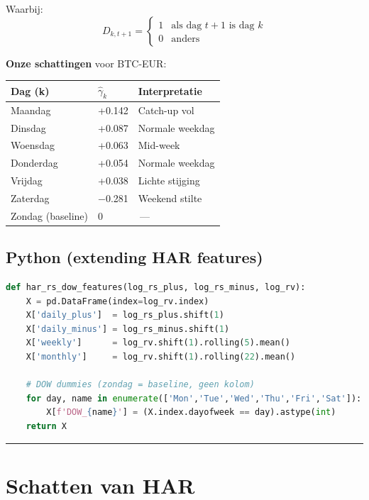 \documentclass[11pt,a4paper]{article}
\begin{document}
Waarbij:
\[D_{k,t+1} = \begin{cases} 1 & \text{als dag } t+1 \text{ is dag } k \\ 0 & \text{anders} \end{cases}\]

\textbf{Onze schattingen} voor BTC-EUR:

\begin{longtable}[]{@{}lll@{}}
\toprule
Dag (k) & \(\hat\gamma_k\) & Interpretatie \\
\midrule
\endhead
Maandag & +0.142 & Catch-up vol \\
Dinsdag & +0.087 & Normale weekdag \\
Woensdag & +0.063 & Mid-week \\
Donderdag & +0.054 & Normale weekdag \\
Vrijdag & +0.038 & Lichte stijging \\
Zaterdag & −0.281 & Weekend stilte \\
Zondag (baseline) & 0 & \,---\, \\
\bottomrule
\end{longtable}

\hypertarget{python-extending-har-features}{%
\subsection{Python (extending HAR features)}\label{python-extending-har-features}}

\begin{lstlisting}[language=Python]
def har_rs_dow_features(log_rs_plus, log_rs_minus, log_rv):
    X = pd.DataFrame(index=log_rv.index)
    X['daily_plus']  = log_rs_plus.shift(1)
    X['daily_minus'] = log_rs_minus.shift(1)
    X['weekly']      = log_rv.shift(1).rolling(5).mean()
    X['monthly']     = log_rv.shift(1).rolling(22).mean()
    
    # DOW dummies (zondag = baseline, geen kolom)
    for day, name in enumerate(['Mon','Tue','Wed','Thu','Fri','Sat']):
        X[f'DOW_{name}'] = (X.index.dayofweek == day).astype(int)
    return X
\end{lstlisting}

\begin{center}\rule{0.5\linewidth}{0.5pt}\end{center}

\hypertarget{schatten-van-har}{%
\section{Schatten van HAR}\label{schatten-van-har}}
\end{document}
